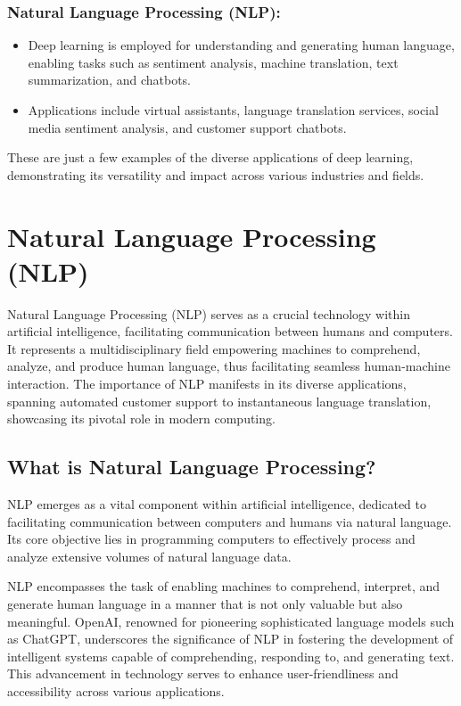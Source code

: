 \subsubsection*{Natural Language Processing (NLP):}

\begin{itemize}
    \item Deep learning is employed for understanding and generating human language, enabling tasks such as sentiment analysis, machine translation, text summarization, and chatbots.
    \item Applications include virtual assistants, language translation services, social media sentiment analysis, and customer support chatbots.
\end{itemize}


These are just a few examples of the diverse applications of deep learning, demonstrating its versatility and impact across various industries and fields.

\clearpage

\section{Natural Language Processing (NLP)}

Natural Language Processing (NLP) serves as a crucial technology within artificial intelligence, facilitating communication between humans and computers. It represents a multidisciplinary field empowering machines to comprehend, analyze, and produce human language, thus facilitating seamless human-machine interaction. The importance of NLP manifests in its diverse applications, spanning automated customer support to instantaneous language translation, showcasing its pivotal role in modern computing.

\subsection{What is Natural Language Processing?}

NLP emerges as a vital component within artificial intelligence, dedicated to facilitating communication between computers and humans via natural language. Its core objective lies in programming computers to effectively process and analyze extensive volumes of natural language data.

NLP encompasses the task of enabling machines to comprehend, interpret, and generate human language in a manner that is not only valuable but also meaningful. OpenAI, renowned for pioneering sophisticated language models such as ChatGPT, underscores the significance of NLP in fostering the development of intelligent systems capable of comprehending, responding to, and generating text. This advancement in technology serves to enhance user-friendliness and accessibility across various applications.

